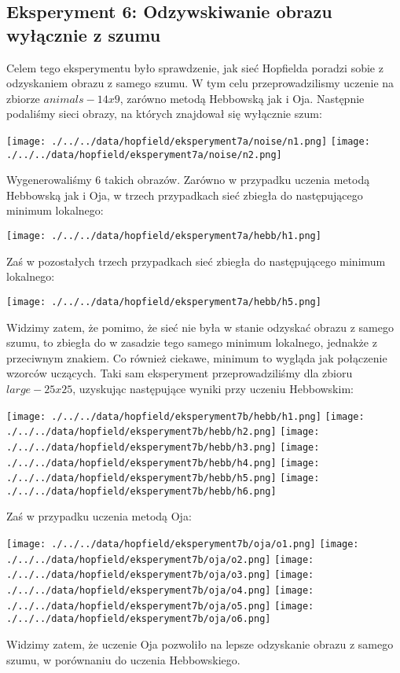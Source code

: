 \documentclass{article}
\begin{document}
\subsection{Eksperyment 6: Odzywskiwanie obrazu wyłącznie z szumu}
Celem tego eksperymentu było sprawdzenie, jak sieć Hopfielda poradzi sobie z odzyskaniem obrazu z samego szumu.
W tym celu przeprowadzilismy uczenie na zbiorze $animals-14x9$, zarówno metodą Hebbowską jak i Oja.
Następnie podaliśmy sieci obrazy, na których znajdował się wyłącznie szum:
\begin{center}
    \texttt{[image: ./../../data/hopfield/eksperyment7a/noise/n1.png]}
    \texttt{[image: ./../../data/hopfield/eksperyment7a/noise/n2.png]}
\end{center}
Wygenerowaliśmy $6$ takich obrazów. Zarówno w przypadku uczenia metodą Hebbowską jak i Oja,
 w trzech przypadkach sieć zbiegła do następującego minimum lokalnego:
\begin{center}
    \texttt{[image: ./../../data/hopfield/eksperyment7a/hebb/h1.png]}
\end{center}
Zaś w pozostałych trzech przypadkach sieć zbiegła do następującego minimum lokalnego:
\begin{center}
    \texttt{[image: ./../../data/hopfield/eksperyment7a/hebb/h5.png]}
\end{center}
Widzimy zatem, że pomimo, że sieć nie była w stanie odzyskać obrazu z samego szumu, to zbiegła do 
w zasadzie tego samego minimum lokalnego, jednakże z przeciwnym znakiem.
Co również ciekawe, minimum to wygląda jak połączenie wzorców uczących.
Taki sam eksperyment przeprowadziliśmy dla zbioru $large-25x25$, uzyskując następujące wyniki przy uczeniu Hebbowskim:
\begin{center}
    \texttt{[image: ./../../data/hopfield/eksperyment7b/hebb/h1.png]}
    \texttt{[image: ./../../data/hopfield/eksperyment7b/hebb/h2.png]}
    \texttt{[image: ./../../data/hopfield/eksperyment7b/hebb/h3.png]}
    \texttt{[image: ./../../data/hopfield/eksperyment7b/hebb/h4.png]}
    \texttt{[image: ./../../data/hopfield/eksperyment7b/hebb/h5.png]}
    \texttt{[image: ./../../data/hopfield/eksperyment7b/hebb/h6.png]}
\end{center}
Zaś w przypadku uczenia metodą Oja:
\begin{center}
    \texttt{[image: ./../../data/hopfield/eksperyment7b/oja/o1.png]}
    \texttt{[image: ./../../data/hopfield/eksperyment7b/oja/o2.png]}
    \texttt{[image: ./../../data/hopfield/eksperyment7b/oja/o3.png]}
    \texttt{[image: ./../../data/hopfield/eksperyment7b/oja/o4.png]}
    \texttt{[image: ./../../data/hopfield/eksperyment7b/oja/o5.png]}
    \texttt{[image: ./../../data/hopfield/eksperyment7b/oja/o6.png]}
\end{center}
Widzimy zatem, że uczenie Oja pozwoliło na lepsze odzyskanie obrazu z samego szumu,
w porównaniu do uczenia Hebbowskiego. 
\end{document}
